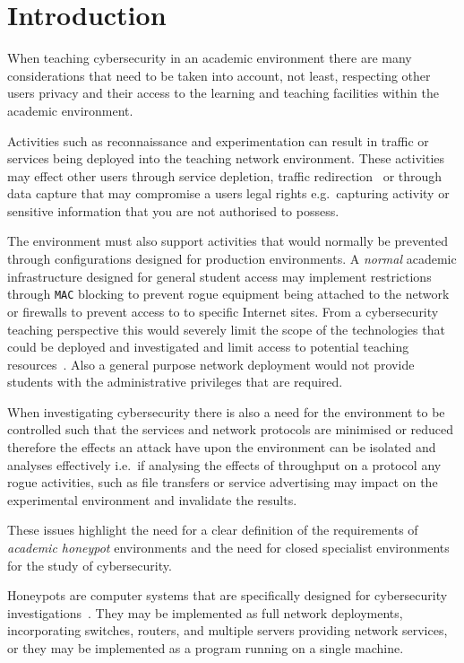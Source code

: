 \documentclass{llncs}
\begin{document}
\section{Introduction}\label{intro}
When teaching cybersecurity in an academic environment there are many
considerations that need to be taken into account, not least, respecting other
users privacy and their access to the learning and teaching facilities within
the academic environment.

Activities such as reconnaissance and experimentation can result in traffic or
services being deployed into the teaching network environment. These activities
may effect other users through service depletion, traffic
redirection~\cite{ACGO:06,LR:06} or through data capture that may compromise a
users legal rights e.g.\ capturing activity or sensitive information that you
are not authorised to possess.

The environment must also support activities that would normally be prevented
through configurations designed for production environments. A \emph{normal}
academic infrastructure designed for general student access may implement
restrictions through \texttt{MAC} blocking to prevent rogue equipment being
attached to the network or firewalls to prevent access to to specific Internet
sites. From a cybersecurity teaching perspective this would severely limit the
scope of the technologies that could be deployed and investigated and limit
access to potential teaching resources~\cite{ACGO:06,YYLCHJ:04}. Also a general
purpose network deployment would not provide students with the administrative
privileges that are required.

When investigating cybersecurity there is also a need for the environment to
be controlled such that the services and network protocols are minimised or
reduced  therefore the effects an attack have upon the environment can be
isolated and analyses effectively i.e.\ if analysing the effects of throughput
on a protocol any rogue activities, such as file transfers or service
advertising may impact on the experimental environment and invalidate the
results.

These issues highlight the need for a clear definition of the requirements of
\emph{academic honeypot} environments and the need for closed specialist
environments for the study of cybersecurity.

Honeypots are computer systems that are specifically designed for
cybersecurity investigations~\cite{FKAS:17,BCF:12,ZZQL:03}. They may be
implemented as full network deployments, incorporating switches, routers, and
multiple servers providing network services, or they may be implemented as a
program running on a single machine. 
\end{document}
